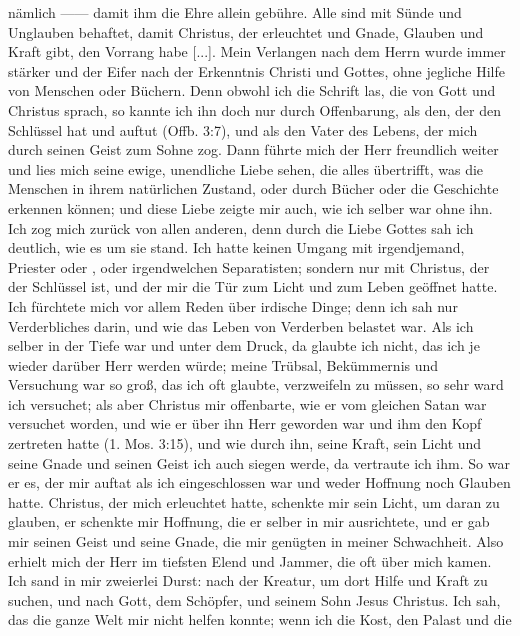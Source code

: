 nämlich —— damit ihm die Ehre allein gebühre. Alle sind mit
Sünde und Unglauben behaftet, damit Christus, der erleuchtet
und Gnade, Glauben und Kraft gibt, den Vorrang habe [...].
Mein Verlangen nach dem Herrn wurde immer stärker und der
Eifer nach der Erkenntnis Christi und Gottes, ohne jegliche Hilfe
von Menschen oder Büchern. Denn obwohl ich die Schrift las,
die von Gott und Christus sprach, so kannte ich ihn doch nur
durch Offenbarung, als den, der den Schlüssel hat und auftut
(Offb. 3:7), und als den Vater 
des Lebens, der mich durch seinen
Geist zum Sohne zog. Dann führte mich der Herr freundlich
weiter und lies mich seine ewige, unendliche Liebe sehen, die
alles übertrifft, was die Menschen in ihrem natürlichen Zustand,
oder durch Bücher oder die Geschichte erkennen können;
und diese Liebe zeigte mir auch, wie ich selber war ohne ihn.
Ich zog mich zurück von allen anderen, denn durch die Liebe
Gottes sah ich deutlich, wie es um sie stand. Ich hatte keinen
Umgang mit irgendjemand, Priester oder , oder
irgendwelchen Separatisten; sondern nur mit Christus, der der
Schlüssel ist, und der mir die Tür zum Licht und zum Leben 
geöffnet hatte. Ich fürchtete mich vor allem Reden über irdische Dinge;
denn ich sah nur Verderbliches darin, und wie das Leben von 
Verderben belastet war. Als ich selber in der Tiefe war und unter dem
Druck, da glaubte ich nicht, das ich je wieder darüber Herr werden
würde; meine Trübsal, Bekümmernis und Versuchung war so
groß, das ich oft glaubte, verzweifeln zu müssen, so sehr ward
ich versuchet; als aber Christus mir offenbarte, wie er vom gleichen
Satan war versuchet worden, und wie er über ihn Herr geworden
war und ihm den Kopf zertreten hatte 
(1. Mos. 3:15), und wie durch
ihn, seine Kraft, sein Licht und seine Gnade und seinen Geist ich
auch siegen werde, da vertraute ich ihm. So war er es, der mir
auftat als ich eingeschlossen war und weder Hoffnung noch Glauben
hatte. Christus, der mich erleuchtet hatte, schenkte mir sein Licht,
um daran zu glauben, er schenkte mir Hoffnung, die er selber in
mir ausrichtete, und er gab mir seinen Geist und seine Gnade,
die mir genügten in meiner Schwachheit. Also erhielt mich der
Herr im tiefsten Elend und Jammer, die oft über mich kamen.
Ich sand in mir zweierlei Durst: nach der Kreatur, um dort
Hilfe und Kraft zu suchen, und nach Gott, dem Schöpfer, und
seinem Sohn Jesus Christus. Ich sah, das die ganze Welt mir
nicht helfen konnte; wenn ich die Kost, den Palast und die
